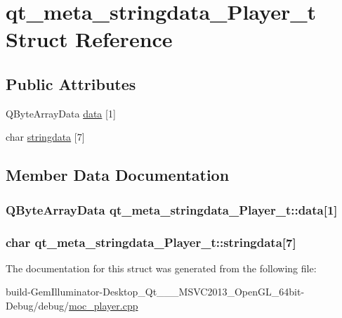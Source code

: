 \hypertarget{structqt__meta__stringdata___player__t}{\section{qt\+\_\+meta\+\_\+stringdata\+\_\+\+Player\+\_\+t Struct Reference}
\label{structqt__meta__stringdata___player__t}
}
\subsection*{Public Attributes}
\begin{DoxyCompactItemize}
\item 
Q\+Byte\+Array\+Data \hyperlink{structqt__meta__stringdata___player__t_adf4edfe4a5fd0e626352d4a62025cf36}{data} \mbox{[}1\mbox{]}
\item 
char \hyperlink{structqt__meta__stringdata___player__t_a1784784ca6ea530039f58c7777386837}{stringdata} \mbox{[}7\mbox{]}
\end{DoxyCompactItemize}


\subsection{Member Data Documentation}
\hypertarget{structqt__meta__stringdata___player__t_adf4edfe4a5fd0e626352d4a62025cf36}{
\subsubsection[{data}]{\setlength{\rightskip}{0pt plus 5cm}Q\+Byte\+Array\+Data qt\+\_\+meta\+\_\+stringdata\+\_\+\+Player\+\_\+t\+::data\mbox{[}1\mbox{]}}}\label{structqt__meta__stringdata___player__t_adf4edfe4a5fd0e626352d4a62025cf36}
\hypertarget{structqt__meta__stringdata___player__t_a1784784ca6ea530039f58c7777386837}{
\subsubsection[{stringdata}]{\setlength{\rightskip}{0pt plus 5cm}char qt\+\_\+meta\+\_\+stringdata\+\_\+\+Player\+\_\+t\+::stringdata\mbox{[}7\mbox{]}}}\label{structqt__meta__stringdata___player__t_a1784784ca6ea530039f58c7777386837}


The documentation for this struct was generated from the following file\+:\begin{DoxyCompactItemize}
\item 
build-\/\+Gem\+Illuminator-\/\+Desktop\+\_\+\+Qt\+\_\+\_\+\_\+\+M\+S\+V\+C2013\+\_\+\+Open\+G\+L\+\_\+64bit-\/\+Debug/debug/\hyperlink{moc__player_8cpp}{moc\+\_\+player.\+cpp}\end{DoxyCompactItemize}
